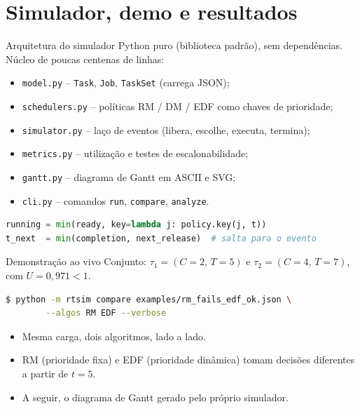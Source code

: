 \documentclass[aspectratio=169,xcolor=table]{beamer}
\begin{document}
\section{Simulador, demo e resultados}
\begin{frame}[fragile]{Arquitetura do simulador}
    Python puro (biblioteca padrão), sem dependências. Núcleo de poucas centenas de linhas:
    \begin{itemize}
        \item \texttt{model.py} -- \texttt{Task}, \texttt{Job}, \texttt{TaskSet} (carrega JSON);
        \item \texttt{schedulers.py} -- políticas RM / DM / EDF como chaves de prioridade;
        \item \texttt{simulator.py} -- laço de eventos (libera, escolhe, executa, termina);
        \item \texttt{metrics.py} -- utilização e testes de escalonabilidade;
        \item \texttt{gantt.py} -- diagrama de Gantt em ASCII e SVG;
        \item \texttt{cli.py} -- comandos \texttt{run}, \texttt{compare}, \texttt{analyze}.
    \end{itemize}
    \begin{lstlisting}[language=Python]
running = min(ready, key=lambda j: policy.key(j, t))
t_next  = min(completion, next_release)  # salta para o evento
    \end{lstlisting}
\end{frame}

\begin{frame}[fragile]{Demonstração ao vivo}
    Conjunto: $\tau_1=(C{=}2,\,T{=}5)$ e $\tau_2=(C{=}4,\,T{=}7)$, com $U = 0{,}971 < 1$.
    \begin{lstlisting}[language=bash]
$ python -m rtsim compare examples/rm_fails_edf_ok.json \
        --algos RM EDF --verbose
    \end{lstlisting}
    \begin{itemize}
        \item Mesma carga, dois algoritmos, lado a lado.
        \item RM (prioridade fixa) e EDF (prioridade dinâmica) tomam decisões diferentes a partir de $t=5$.
        \item A seguir, o diagrama de Gantt gerado pelo próprio simulador.
    \end{itemize}
\end{frame}
\end{document}
